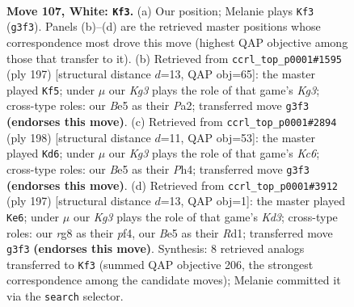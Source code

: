 \documentclass[11pt]{article}
\begin{document}
\clearpage

\begin{figure}[p]\centering
\begin{subfigure}{0.46\textwidth}\centering
\resizebox{\linewidth}{!}{%
\newchessgame
\chessboard[
  setfen={6r1/8/7k/4B3/R7/P5K1/8/8 w - - 6 107},
  showmover=false,
  pgfstyle=straightmove, color=movearrow, markmove={g3-f3}
]}
\caption{}
\end{subfigure}\hfill
\begin{subfigure}{0.46\textwidth}\centering
\resizebox{\linewidth}{!}{%
\newchessgame
\chessboard[
  setfen={8/8/r2P2k1/8/8/3K4/p7/6R1 b - - 4 99},
  showmover=false,
  pgfstyle=straightmove, color=movearrow, markmove={g6-f5}
]}
\caption{}
\end{subfigure}
\\[4pt]
\begin{subfigure}{0.46\textwidth}\centering
\resizebox{\linewidth}{!}{%
\newchessgame
\chessboard[
  setfen={1R6/1P5k/2K5/8/7P/8/2r5/8 w - - 11 100},
  showmover=false,
  pgfstyle=straightmove, color=movearrow, markmove={c6-d6}
]}
\caption{}
\end{subfigure}\hfill
\begin{subfigure}{0.46\textwidth}\centering
\resizebox{\linewidth}{!}{%
\newchessgame
\chessboard[
  setfen={8/8/3k4/8/2K1pP2/4R3/8/3r4 b - - 5 99},
  showmover=false,
  pgfstyle=straightmove, color=movearrow, markmove={d6-e6}
]}
\caption{}
\end{subfigure}
\caption{\textbf{Move 107, White: \texttt{Kf3}.} (a) Our position; Melanie plays \texttt{Kf3} (\texttt{g3f3}). Panels (b)--(d) are the retrieved master positions whose correspondence most drove this move (highest QAP objective among those that transfer to it). (b) Retrieved from \texttt{ccrl\_top\_p0001\#1595} (ply 197) [structural distance $d$=13, QAP obj=65]: the master played \texttt{Kf5}; under $\mu$ our \emph{Kg3} plays the role of that game's \emph{Kg3}; cross-type roles: our \emph{B}e5 as their \emph{P}a2; transferred move \texttt{g3f3} \textbf{(endorses this move)}. (c) Retrieved from \texttt{ccrl\_top\_p0001\#2894} (ply 198) [structural distance $d$=11, QAP obj=53]: the master played \texttt{Kd6}; under $\mu$ our \emph{Kg3} plays the role of that game's \emph{Kc6}; cross-type roles: our \emph{B}e5 as their \emph{P}h4; transferred move \texttt{g3f3} \textbf{(endorses this move)}. (d) Retrieved from \texttt{ccrl\_top\_p0001\#3912} (ply 197) [structural distance $d$=13, QAP obj=1]: the master played \texttt{Ke6}; under $\mu$ our \emph{Kg3} plays the role of that game's \emph{Kd3}; cross-type roles: our \emph{r}g8 as their \emph{p}f4, our \emph{B}e5 as their \emph{R}d1; transferred move \texttt{g3f3} \textbf{(endorses this move)}. Synthesis: 8 retrieved analogs transferred to \texttt{Kf3} (summed QAP objective 206, the strongest correspondence among the candidate moves); Melanie committed it via the \texttt{search} selector.}
\label{fig:thought-m212}
\end{figure}
\end{document}

